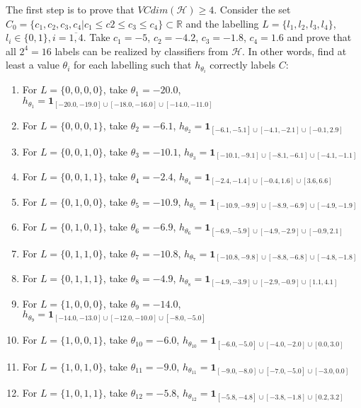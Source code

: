 \documentclass{article}
\begin{document}
The first step is to prove that $VCdim(\mathcal{H})\geq 4$. Consider the set $C_0=\{c_1,c_2,c_3,c_4|c_1\leq c2\leq c_3\leq c_4\}\subset\mathbb{R}$ and the labelling $L=\{l_1,l_2,l_3,l_4\}$, $l_i\in\{0,1\}, i=\overline{1,4}$. Take $c_1 = -5$, $c_2=-4.2$, $c_3=-1.8$, $c_4=1.6$ and prove that all $2^4=16$ labels can be realized by classifiers from $\mathcal{H}$. In other words, find at least a value $\theta_i$ for each labelling such that $h_{\theta_i}$ correctly labels $C$:
\begin{multicols}{2}
\begin{enumerate}
	\item For $L=\{0, 0, 0, 0\}$, take $\theta_1=  -20.0$,   $h_{\theta_1}=\mathbf 1_{[-20.0, -19.0]\cup[-18.0, -16.0]\cup[-14.0, -11.0]}$
	\item For $L=\{0, 0, 0, 1\}$, take $\theta_2=  -6.1$,    $h_{\theta_2}=\mathbf 1_{[-6.1, -5.1]\cup[-4.1, -2.1]\cup[-0.1, 2.9]}$
	\item For $L=\{0, 0, 1, 0\}$, take $\theta_3=  -10.1$,   $h_{\theta_3}=\mathbf 1_{[-10.1, -9.1]\cup[-8.1, -6.1]\cup[-4.1, -1.1]}$
	\item For $L=\{0, 0, 1, 1\}$, take $\theta_4=  -2.4$,    $h_{\theta_4}=\mathbf 1_{[-2.4, -1.4]\cup[-0.4, 1.6]\cup[3.6, 6.6]}$
	\item For $L=\{0, 1, 0, 0\}$, take $\theta_5=  -10.9$,   $h_{\theta_5}=\mathbf 1_{[-10.9, -9.9]\cup[-8.9, -6.9]\cup[-4.9, -1.9]}$
	\item For $L=\{0, 1, 0, 1\}$, take $\theta_6=  -6.9$,    $h_{\theta_6}=\mathbf 1_{[-6.9, -5.9]\cup[-4.9, -2.9]\cup[-0.9, 2.1]}$
	\item For $L=\{0, 1, 1, 0\}$, take $\theta_7=  -10.8$,   $h_{\theta_7}=\mathbf 1_{[-10.8, -9.8]\cup[-8.8, -6.8]\cup[-4.8, -1.8]}$
	\item For $L=\{0, 1, 1, 1\}$, take $\theta_8=  -4.9$,    $h_{\theta_8}=\mathbf 1_{[-4.9, -3.9]\cup[-2.9, -0.9]\cup[1.1, 4.1]}$
	\item For $L=\{1, 0, 0, 0\}$, take $\theta_9=  -14.0$,   $h_{\theta_9}=\mathbf 1_{[-14.0, -13.0]\cup[-12.0, -10.0]\cup[-8.0, -5.0]}$
	\item For $L=\{1, 0, 0, 1\}$, take $\theta_{10}=-6.0$,   $h_{\theta_{10}}=\mathbf 1_{[-6.0, -5.0]\cup[-4.0, -2.0]\cup[0.0, 3.0]}$
	\item For $L=\{1, 0, 1, 0\}$, take $\theta_{11}=-9.0$,   $h_{\theta_{11}}=\mathbf 1_{[-9.0, -8.0]\cup[-7.0, -5.0]\cup[-3.0, 0.0]}$
	\item For $L=\{1, 0, 1, 1\}$, take $\theta_{12}=-5.8$,   $h_{\theta_{12}}=\mathbf 1_{[-5.8, -4.8]\cup[-3.8, -1.8]\cup[0.2, 3.2]}$

\end{enumerate}
\end{multicols}
\end{document}
